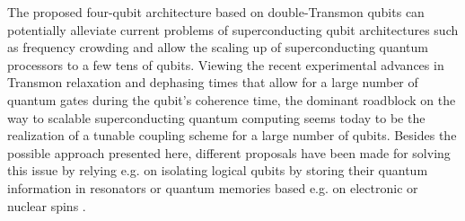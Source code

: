 The proposed four-qubit architecture based on double-Transmon qubits can potentially alleviate current problems of superconducting qubit architectures such as frequency crowding and allow the scaling up of superconducting quantum processors to a few tens of qubits. Viewing the recent experimental advances in Transmon relaxation and dephasing times \citep{paik_observation_2011} that allow for a large number of quantum gates during the qubit's coherence time, the dominant roadblock on the way to scalable superconducting quantum computing seems today to be the realization of a tunable coupling scheme for a large number of qubits. Besides the possible approach presented here, different proposals have been made for solving this issue by relying e.g. on isolating logical qubits by storing their quantum information in resonators \citep{galiautdinov_resonatorzero-qubit_2012,mariantoni_implementing_2011} or quantum memories based e.g. on electronic or nuclear spins \citep{zhu_coherent_2011,kubo_storage_2012,kubo_hybrid_2011}.